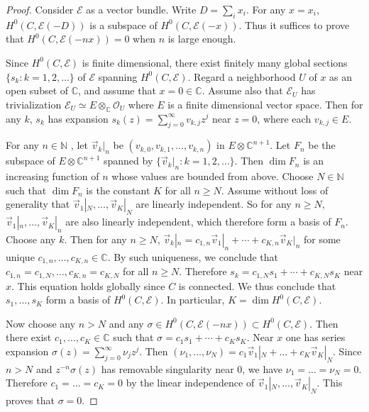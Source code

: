 \documentclass[12pt,a4paper,notitlepage]{report}
\theoremstyle{definition}
\theoremstyle{plain}
\newcommand{\scr}{\mathscr}
\newcommand{\Cbb}{\mathbb C}
\numberwithin{equation}{section}
\begin{document}
\begin{proof}
Consider $\scr E$ as a vector bundle. Write $D=\sum_i x_i$. For any $x=x_i$, $H^0(C,\scr E(-D))$ is a subspace of $H^0(C,\scr E(-x))$. Thus it suffices to prove that $H^0(C,\scr E(-nx))=0$ when $n$ is large enough. 

Since $H^0(C,\scr E)$ is finite dimensional, there exist finitely many global sections $\{s_k:k=1,2,\dots \}$ of $\scr E$ spanning $H^0(C,\scr E)$. Regard a neighborhood $U$ of $x$ as an open subset of $\Cbb$, and assume that $x=0\in\mathbb C$. Assume also that $\scr E_U$ has trivialization $\scr E_U\simeq E\otimes_{\mathbb C} \scr O_U$ where $E$ is a finite dimensional vector space. Then for any $k$, $s_k$ has expansion $s_k(z)=\sum_{j=0}^{\infty}v_{k,j}z^j$ near $z=0$, where each $v_{k,j}\in E$.

For any $n\in\mathbb N$ , let $\vec{v}_k|_n$ be $(v_{k,0},v_{k,1},\dots,v_{k,n})$ in $E\otimes\mathbb C^{n+1}$. Let $F_n$ be the subspace of $E\otimes\mathbb C^{n+1}$ spanned by $\{\vec{v}_k|_n:k=1,2,\dots\}$. Then $\dim F_n$ is an increasing function of $n$ whose values are bounded from above. Choose $N\in\mathbb N$ such that $\dim F_n$ is the constant $K$ for all $n\geq N$. Assume without loss of generality that $\vec{v}_1|_N,\dots,\vec{v}_K|_N$ are linearly independent. So for any $n\geq N$, $\vec{v}_1|_n,\dots,\vec{v}_K|_n$ are also linearly independent, which therefore form a basis of $F_n$. Choose any $k$. Then for any $n\geq N$, $\vec{v}_k|_n=c_{1,n}\vec{v}_1|_n+\cdots+c_{K,n}\vec{v}_K|_n$ for some unique $c_{1,n},\dots,c_{K,n}\in\mathbb C$. By such uniqueness, we conclude that $c_{1,n}=c_{1,N},\dots,c_{K,n}=c_{K,N}$ for all $n\geq N$. Therefore $s_k=c_{1,N}s_1+\cdots+c_{K,N}s_K$ near $x$. This equation holds globally since $C$ is connected. We thus conclude that $s_1,\dots, s_K$ form a basis of $H^0(C,\scr E)$. In particular, $K=\dim H^0(C,\scr E)$.

Now choose any $n>N$ and any $\sigma\in H^0(C,\scr E(-nx))\subset H^0(C,\scr E)$. Then there exist $c_1,\dots,c_K\in\mathbb C$ such that $\sigma=c_1s_1+\cdots+c_Ks_K$. Near $x$ one has series expansion $\sigma(z)=\sum_{j=0}^\infty \nu_jz^j$. Then $(\nu_1,\dots,\nu_N)=c_1\vec{v}_1|_N+\dots+c_K\vec{v}_K|_N$. Since $n>N$ and $z^{-n}\sigma(z)$ has removable singularity near $0$, we have $\nu_1=\dots=\nu_N=0$. Therefore $c_1=\dots=c_K=0$ by the linear independence of $\vec{v}_1|_N,\dots,\vec{v}_K|_N$. This proves that $\sigma=0$.
\end{proof}
\end{document}
